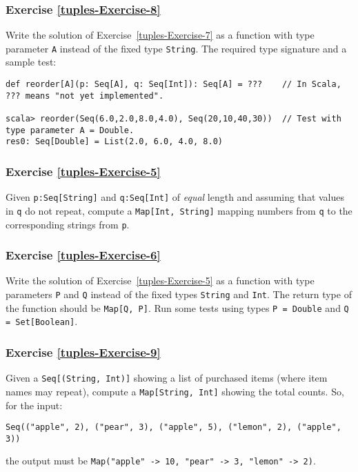\subsubsection{Exercise \label{tuples-Exercise-8}\ref{tuples-Exercise-8}}

Write the solution of Exercise~\ref{tuples-Exercise-7} as a function
with type parameter \lstinline!A! instead of the fixed type \lstinline!String!.
The required type signature and a sample test:
\begin{lstlisting}
def reorder[A](p: Seq[A], q: Seq[Int]): Seq[A] = ???    // In Scala, ??? means "not yet implemented".

scala> reorder(Seq(6.0,2.0,8.0,4.0), Seq(20,10,40,30))  // Test with type parameter A = Double.
res0: Seq[Double] = List(2.0, 6.0, 4.0, 8.0)
\end{lstlisting}


\subsubsection{Exercise \label{tuples-Exercise-5}\ref{tuples-Exercise-5}}

Given \lstinline!p:Seq[String]! and \lstinline!q:Seq[Int]! of \emph{equal}
length and assuming that values in \lstinline!q! do not repeat, compute
a \lstinline!Map[Int, String]! mapping numbers from \lstinline!q!
to the corresponding strings from \lstinline!p!.

\subsubsection{Exercise \label{tuples-Exercise-6}\ref{tuples-Exercise-6}}

Write the solution of Exercise~\ref{tuples-Exercise-5} as a function
with type parameters \lstinline!P! and \lstinline!Q! instead of
the fixed types \lstinline!String! and \lstinline!Int!. The return
type of the function should be \lstinline!Map[Q, P]!. Run some tests
using types \lstinline!P = Double! and \lstinline!Q = Set[Boolean]!.

\subsubsection{Exercise \label{tuples-Exercise-9}\ref{tuples-Exercise-9}}

Given a \lstinline!Seq[(String, Int)]! showing a list of purchased
items (where item names may repeat), compute a \lstinline!Map[String, Int]!
showing the total counts. So, for the input: 
\begin{lstlisting}
Seq(("apple", 2), ("pear", 3), ("apple", 5), ("lemon", 2), ("apple", 3))
\end{lstlisting}
the output must be \lstinline!Map("apple" -> 10, "pear" -> 3, "lemon" -> 2)!.

